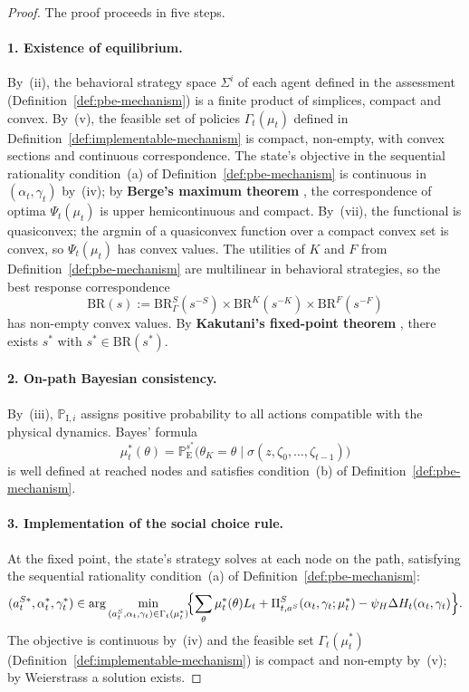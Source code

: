 \documentclass[ecta,nameyear,final,supplement]{econsocart}
\numberwithin{equation}{section}
\numberwithin{table}{section}
\theoremstyle{definition}
\newcommand{\ProbE}{\mathbb{P}_{\mathrm{E}}}
\newcommand{\ProbI}[1]{\mathbb{P}_{\mathrm{I},#1}}
\begin{document}
\begin{proof}
The proof proceeds in five steps.

\paragraph{1. Existence of equilibrium.}
By~(ii), the behavioral strategy space $\Sigma^i$ of each agent defined in the assessment (Definition~\ref{def:pbe-mechanism}) is a finite
product of simplices, compact and convex. By~(v), the feasible set of policies $\Gamma_t(\mu_t)$ defined in Definition~\ref{def:implementable-mechanism}
is compact, non-empty, with convex sections and continuous
correspondence. The state's objective in the sequential rationality condition~(a) of Definition~\ref{def:pbe-mechanism} is continuous in $(\alpha_t,\gamma_t)$
by~(iv); by \textbf{Berge's maximum theorem} \citep{AliprantisBorder2006}, the
correspondence of optima $\Psi_t(\mu_t)$ is upper hemicontinuous and compact.
By~(vii), the functional is quasiconvex; the argmin of a quasiconvex function
over a compact convex set is convex, so $\Psi_t(\mu_t)$ has convex values. The
utilities of $K$ and $F$ from Definition~\ref{def:pbe-mechanism} are multilinear in behavioral strategies, so the best
response correspondence
\[
\mathrm{BR}(s)
:=\mathrm{BR}^S_\Gamma(s^{-S})\times\mathrm{BR}^K(s^{-K})
  \times\mathrm{BR}^F(s^{-F})
\]
has non-empty convex values. By \textbf{Kakutani's fixed-point theorem}
\citep{Kakutani1941}, there exists $s^\ast$ with
$s^\ast\in\mathrm{BR}(s^\ast)$.

\paragraph{2. On-path Bayesian consistency.}
By~(iii), $\ProbI{i}$ assigns positive probability to all actions compatible
with the physical dynamics. Bayes' formula
\[
\mu_t^\ast(\theta)
=\ProbE^{s^\ast}\!\bigl(\theta_K=\theta\mid\sigma(z,\zeta_0,\ldots,\zeta_{t-1})\bigr)
\]
is well defined at reached nodes and satisfies condition~(b) of
Definition~\ref{def:pbe-mechanism}.

\paragraph{3. Implementation of the social choice rule.}
At the fixed point, the state's strategy solves at each node on the path, satisfying the sequential rationality condition~(a) of Definition~\ref{def:pbe-mechanism}:
\[
(a_t^{S\ast},\alpha_t^\ast,\gamma_t^\ast)
\in\arg\min_{(a_t^S,\alpha_t,\gamma_t)\in\Gamma_t(\mu_t^\ast)}
\!\Bigl\{\sum_\theta\mu_t^\ast(\theta)L_t
+\Pi_{t,a^S}^S(\alpha_t,\gamma_t;\mu_t^\ast)
-\psi_H\Delta H_t(\alpha_t,\gamma_t)\Bigr\}.
\]
The objective is continuous by~(iv) and the feasible set $\Gamma_t(\mu_t^\ast)$ (Definition~\ref{def:implementable-mechanism}) is compact and
non-empty by~(v); by Weierstrass a solution exists.


\end{proof}
\end{document}
